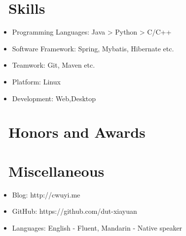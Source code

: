 \documentclass{resume}
\begin{document}

\section{\faCogs\ Skills}
\begin{itemize}[parsep=0.5ex]
  \item Programming Languages: Java > Python > C/C++
  \item Software Framework: Spring, Mybatis, Hibernate etc.
  \item Teamwork: Git, Maven etc.
  \item Platform: Linux
  \item Development: Web,Desktop
\end{itemize}

\section{\faHeartO\ Honors and Awards}

\section{\faInfo\ Miscellaneous}
\begin{itemize}[parsep=0.5ex]
  \item Blog: http://cwuyi.me
  \item GitHub: https://github.com/dut-xiayuan
  \item Languages: English - Fluent, Mandarin - Native speaker
\end{itemize}

%
%
\end{document}
